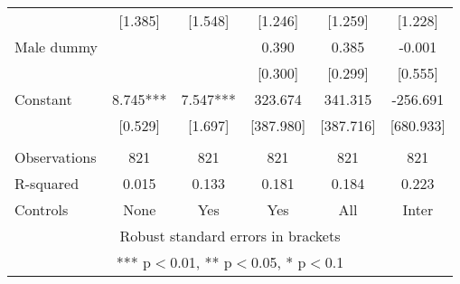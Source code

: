 \begin{tabular}{lccccc}
 & [1.385] & [1.548] & [1.246] & [1.259] & [1.228] \\
Male dummy &  &  & 0.390 & 0.385 & -0.001 \\
 &  &  & [0.300] & [0.299] & [0.555] \\
Constant & 8.745*** & 7.547*** & 323.674 & 341.315 & -256.691 \\
 & [0.529] & [1.697] & [387.980] & [387.716] & [680.933] \\
 &  &  &  &  &  \\
Observations & 821 & 821 & 821 & 821 & 821 \\
R-squared & 0.015 & 0.133 & 0.181 & 0.184 & 0.223 \\
 Controls & None & Yes & Yes & All & Inter \\ \hline
\multicolumn{6}{c}{ Robust standard errors in brackets} \\
\multicolumn{6}{c}{ *** p$<$0.01, ** p$<$0.05, * p$<$0.1} \\
\end{tabular}

